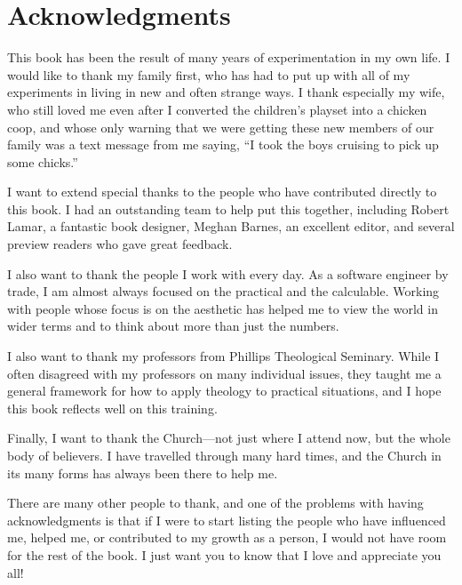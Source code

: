 \chapter*{Acknowledgments}

This book has been the result of many years of experimentation in my own life.
I would like to thank my family first, who has had to put up with all of my 
experiments in living in new and often strange ways.  I thank especially my
wife, who still loved me even after I converted the children's playset into 
a chicken coop, and whose only warning that we were getting these new members
of our family was a text message from me saying,
``I took the boys cruising to pick up some chicks.''  

I want to extend special thanks to the people who have contributed directly
to this book.  I had an outstanding team to help put this together, including
Robert Lamar, a fantastic book designer, Meghan Barnes, an excellent editor,
and several preview readers who gave great feedback.

I also want to thank the people I work with every day.  As a software engineer
by trade, I am almost always focused on the practical and the calculable.
Working with people whose focus is on the aesthetic has helped me to 
view the world in wider terms and to think about more than just the numbers.

I also want to thank my professors from Phillips Theological Seminary.
While I often disagreed with my professors on many individual issues,
they taught me a general framework for how to apply theology to
practical situations, and I hope this book reflects well on this training.  

Finally, I want to thank the Church---not just where I attend now, but the 
whole body of believers.  I have travelled through many hard times, and the
Church in its many forms has always been there to help me.

There are many other people to thank, and one of the problems with having acknowledgments
is that if I were to start listing the people who have influenced me, helped me,
or contributed to my growth as a person, I would not have room for the rest
of the book.  I just want you to know that I love and appreciate you all!
